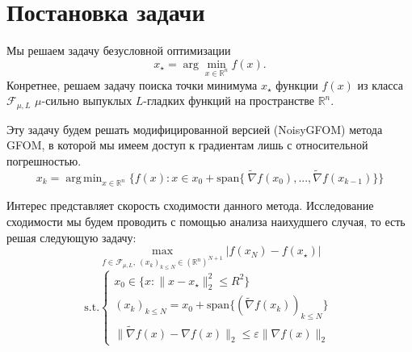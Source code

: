 \documentclass{article}
\DeclareMathOperator*{\argmin}{arg\,min}
\begin{document}

\section{Постановка задачи}
Мы решаем задачу безусловной оптимизации 
\begin{equation} \label{opt_problem}
    x_{\star} = \arg \min_{x \in \mathbb{R}^n} f(x).
\end{equation}
Конретнее, решаем задачу поиска точки минимума $x_{\star}$ функции $f(x)$ из класса $\mathcal{F}_{\mu, L}$ $\mu$-сильно выпуклых $L$-гладких функций на пространстве $\mathbb{R}^n$. 

Эту задачу будем решать модифицированной версией (NoisyGFOM) метода GFOM, в которой мы имеем доступ к градиентам лишь с относительной погрешностью.
\begin{equation} \label{NoisyGFOM}
    x_k = \argmin_{x \in \mathbb{R}^n}\{f(x): x \in x_0 + \text{span}\{\ \widetilde{\nabla} f(x_0), ..., \widetilde{\nabla} f(x_{k-1})\}\} \tag{NoisyGFOM}
\end{equation}


Интерес представляет скорость сходимости данного метода. Исследование сходимости мы будем проводить с помощью анализа наихудшего случая, то есть решая следующую задачу:
\begin{equation}
    \max_{f \in \mathcal{F}_{\mu, L}, \ (x_k)_{k \le N} \in (\mathbb{R}^n)^{N+1}} |f(x_N) - f(x_{\star})|  
\end{equation}
    \[\text{s.t.} 
    \begin{cases}
    x_0 \in \{x: \|x-x_{\star}\|_2^2 
    \le R^2\} \\
    (x_k)_{k \le N} = x_0 + \text{span} \{ (\widetilde{\nabla} f(x_{k}))_{k \le N} \} \\
    \|\widetilde{\nabla} f(x) - \nabla f(x)\|_2 \leq \varepsilon\|\nabla f(x)\|_2 \
\end{cases}\]
\end{document}
